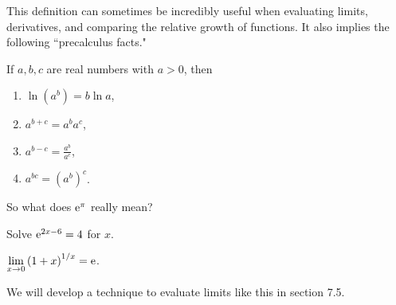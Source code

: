 \begin{remark}
This definition can sometimes be incredibly useful when evaluating limits, derivatives, and comparing the relative growth of functions.
It also implies the following ``precalculus facts."
\end{remark}

\begin{theorem}
If $a, b, c$ are real numbers with $a>0$, then
\begin{enumerate}
\item $\ln(a^b) = b\ln a$,
\item $a^{b+c} = a^ba^c$,
\item $a^{b-c} = \frac{a^b}{a^c}$,
\item $a^{bc} = (a^b)^c$.
\end{enumerate}
\end{theorem}

\begin{example}
So what does $\mathrm{e}^\pi$ really mean?
\end{example}

\ifdefined\SOLUTION
{}
\else
\fi
\vfill

\begin{example}
Solve $\mathrm{e}^{2x-6}=4$ for $x$.
\end{example}

\ifdefined\SOLUTION
{}
\else
\fi
\vfill

\begin{theorem}
$\displaystyle\lim_{x\to 0}\left(1+x\right)^{1/x} = \mathrm{e}$.
\end{theorem}
\begin{remark}
We will develop a technique to evaluate limits like this in section 7.5. 
\end{remark}

